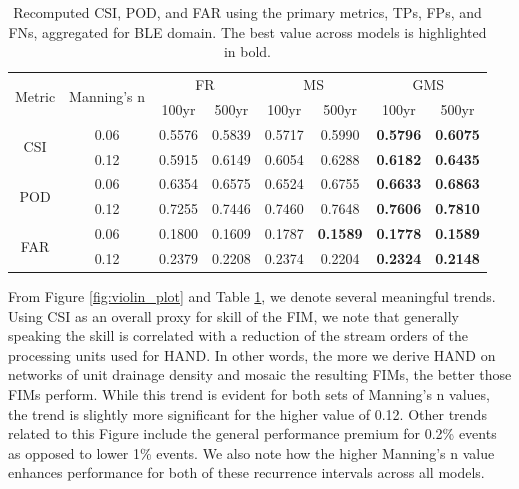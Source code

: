 %
\begin{table}[h!]
\caption{Recomputed CSI, POD, and FAR using the primary metrics, TPs, FPs, and FNs, aggregated for BLE domain.
         The best value across models is highlighted in bold.}
\label{tab:aggregate_metrics}
\centering
\begin{tabular}{|c|c||c|c|c|c|c|c|}
\hline
\multirow{2}{*}{Metric} & \multirow{2}{*}{Manning's n} & \multicolumn{2}{|c|}{FR} & \multicolumn{2}{|c|}{MS} & \multicolumn{2}{|c|}{GMS} \\
\cline{3-8}
  &  & 100yr & 500yr & 100yr & 500yr & 100yr & 500yr \\
\hline
\multirow{2}{*}{CSI} & 0.06 & 0.5576 & 0.5839 & 0.5717 & 0.5990 & \textbf{0.5796} & \textbf{0.6075} \\
\cline{2-8}
  & 0.12 & 0.5915 & 0.6149 & 0.6054 & 0.6288 & \textbf{0.6182} & \textbf{0.6435} \\
\hline
\multirow{2}{*}{POD} & 0.06 & 0.6354 & 0.6575 & 0.6524 & 0.6755 & \textbf{0.6633} & \textbf{0.6863} \\
\cline{2-8}
  & 0.12 & 0.7255 & 0.7446 & 0.7460 & 0.7648 & \textbf{0.7606} & \textbf{0.7810} \\
\hline
\multirow{2}{*}{FAR} & 0.06 & 0.1800 & 0.1609 & 0.1787 & \textbf{0.1589} & \textbf{0.1778} & \textbf{0.1589} \\
\cline{2-8}
  & 0.12 & 0.2379 & 0.2208 & 0.2374 & 0.2204 & \textbf{0.2324} & \textbf{0.2148} \\
\hline
\end{tabular}
\end{table}
%
From Figure \ref{fig:violin_plot} and Table \ref{tab:aggregate_metrics}, we denote several meaningful trends. 
Using CSI as an overall proxy for skill of the FIM, we note that generally speaking the skill is correlated with a reduction of the stream orders of the processing units used for HAND.
In other words, the more we derive HAND on networks of unit drainage density and mosaic the resulting FIMs, the better those FIMs perform.
While this trend is evident for both sets of Manning's n values, the trend is slightly more significant for the higher value of 0.12.
Other trends related to this Figure include the general performance premium for 0.2\% events as opposed to lower 1\% events.
We also note how the higher Manning's n value enhances performance for both of these recurrence intervals across all models.

